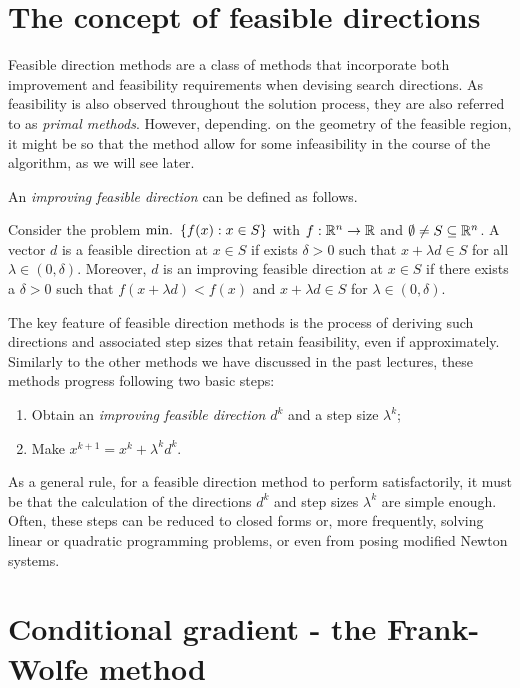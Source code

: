 \section{The concept of feasible directions}

Feasible direction methods are a class of methods that incorporate both improvement and feasibility requirements when devising search directions. As feasibility is also observed throughout the solution process, they are also referred to as \emph{primal methods}. However, depending. on the geometry of the feasible region, it might be so that the method allow for some infeasibility in the course of the algorithm, as we will see later.

An \emph{improving feasible direction} can be defined as follows.
%
\begin{definition}
Consider the problem $\mathop{\text{min.~}}\left\{ f(x) : x \in S \right \}$ with $f:\mathbb{R}^n \rightarrow \mathbb{R}$ and $\emptyset \neq S \subseteq \mathbb{R}^n$. A vector $d$ is a feasible direction at $x \in S$ if exists $\delta > 0$ such that $x + \lambda d \in S$ for all $\lambda \in (0,\delta)$. Moreover, $d$ is an improving feasible direction at $x \in S$ if there exists a $\delta > 0$ such that $f(x + \lambda d) < f(x)$ and $x + \lambda d \in S$ for $\lambda \in (0,\delta)$. 
\end{definition}
%
The key feature of feasible direction methods is the process of deriving such directions and associated step sizes that retain feasibility, even if approximately. Similarly to the other methods we have discussed in the past lectures, these methods progress following two basic steps:
\begin{enumerate}
\item Obtain an \emph{improving feasible direction} $d^k$ and a step size $\lambda^k$;
\item Make $x^{k+1} = x^k + \lambda^kd^k$.
\end{enumerate}

As a general rule, for a feasible direction method to perform satisfactorily, it must be that the calculation of the directions $d^k$ and step sizes $\lambda^k$ are simple enough. Often, these steps can be reduced to closed forms or, more frequently, solving linear or quadratic programming problems, or even from posing modified Newton systems.


\section{Conditional gradient - the Frank-Wolfe method}

